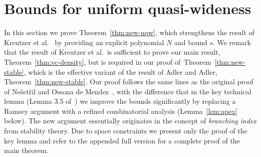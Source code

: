 \section{Bounds for uniform quasi-wideness}\label{sec:uqw}




In this section we prove Theorem~\ref{thm:new-uqw}, which strengthens the 
result of Kreutzer et al.~\cite{siebertz2016polynomial} by providing an explicit polynomial $N$ and bound $s$. 
We remark that the result of Kreutzer et al.~is sufficient to prove our main result, Theorem~\ref{thm:vc-density}, but is required in our proof of~Theorem~\ref{thm:new-stable}, which is the effective 
variant of the result of Adler and Adler, Theorem~\ref{thm:new-stable}.
%
%
%
%
%
Our proof follows the same lines as the original proof of Ne\v set\v ril and Ossona de Mendez~\cite{nevsetvril2010first}, with the difference that in the key technical lemma (Lemma 3.5 of~\cite{nevsetvril2010first}) %
we improve the bounds significantly by replacing a Ramsey argument with a refined combinatorial analysis (Lemma~\ref{lem:apex} below).
The new argument essentially originates in the concept of {\em{branching index}} from stability theory. 
Due to space constraints we present only the proof of 
the key lemma and refer to the appended full version
for a complete proof of the main theorem. 

